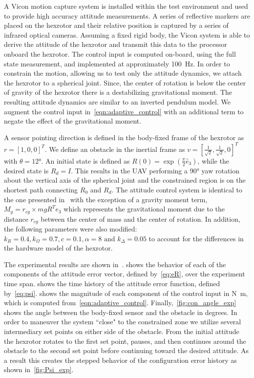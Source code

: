 A Vicon motion capture system is installed within the test environment and used to provide high accuracy attitude measurements. 
A series of reflective markers are placed on the hexrotor and their relative position is captured by a series of infrared optical cameras. 
Assuming a fixed rigid body, the Vicon system is able to derive the attitude of the hexrotor and transmit this data to the processor onboard the hexrotor.
The control input is computed on-board, using the full state measurement, and implemented at approximately \SI{100}{\hertz}.
In order to constrain the motion, allowing us to test only the attitude dynamics, we attach the hexrotor to a spherical joint.
Since, the center of rotation is below the center of gravity of the hexrotor there is a destabilizing gravitational moment.
The resulting attitude dynamics are similar to an inverted pendulum model.
We augment the control input in~\cref{eqn:adaptive_control} with an additional term to negate the effect of the gravitational moment.

A sensor pointing direction is defined in the body-fixed frame of the hexrotor as \( r = [1,0,0]^T \).
We define an obstacle in the inertial frame as \( v = [\frac{1}{\sqrt{2}}, \frac{1}{\sqrt{2}}, 0]^T \) with \( \theta = \ang{12} \).
An initial state is defined as \(R(0) = \exp( \frac{\pi}{2} \hat{e}_3) \), while the desired state is \(R_d =I \).
This results in the UAV performing a \ang{90} yaw rotation about the vertical axis of the spherical joint and the constrained region is on the shortest path connecting $R_0$ and $R_d$. 
The attitude control system is identical to the one presented in~ with the exception of a gravity moment term, \( M_g = r_{cg} \times m g R^T e_3\) which represents the gravitational moment due to the distance \( r_{cg} \) between the center of mass and the center of rotation. 
In addition, the following parameters were also modified: \(k_R = 0.4, k_\Omega = 0.7 ,c = 0.1 , \alpha = 8 \text{ and } k_\Delta = 0.05\) to account for the differences in the hardware model of the hexrotor.

The experimental results are shown in~.
 shows the behavior of each of the components of the attitude error vector, defined by~\cref{eq:eR}, over the experiment time span.
 shows the time history of the attitude error function, defined by~\cref{eq:psi}.
 shows the magnitude of each component of the control input in \si{\newton\meter}, which is computed from~\cref{eqn:adaptive_control}.
Finally,~\cref{fig:con_angle_exp} shows the angle between the body-fixed sensor and the obstacle in degrees.
In order to maneuver the system ``close" to the constrained zone we utilize several intermediary set points on either side of the obstacle.
From the initial attitude the hexrotor rotates to the first set point, pauses, and then continues around the obstacle to the second set point before continuing toward the desired attitude.
As a result this creates the stepped behavior of the configuration error history as shown in~\cref{fig:Psi_exp}.

